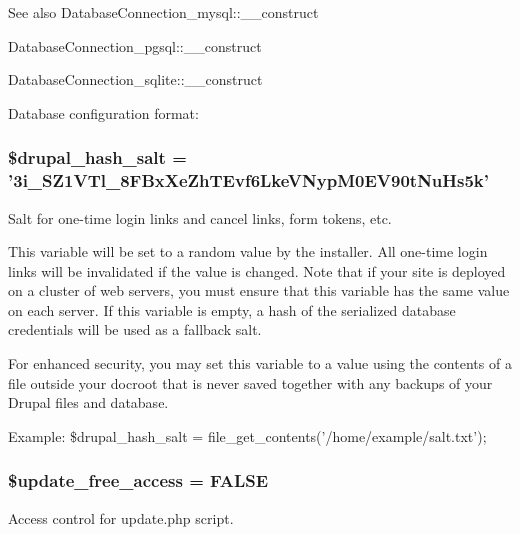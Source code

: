 \begin{DoxySeeAlso}{See also}
DatabaseConnection\_\-mysql::\_\-\_\-construct 

DatabaseConnection\_\-pgsql::\_\-\_\-construct 

DatabaseConnection\_\-sqlite::\_\-\_\-construct
\end{DoxySeeAlso}
Database configuration format: 
 \hypertarget{settings_8php_a75c981b07486dd3b07d5f122702dd87e}{
\subsubsection[{\$drupal\_\-hash\_\-salt}]{\setlength{\rightskip}{0pt plus 5cm}\$drupal\_\-hash\_\-salt = '3i\_\-SZ1VTl\_\-8FBxXeZhTEvf6LkeVNypM0EV90tNuHs5k'}}
\label{settings_8php_a75c981b07486dd3b07d5f122702dd87e}
Salt for one-\/time login links and cancel links, form tokens, etc.

This variable will be set to a random value by the installer. All one-\/time login links will be invalidated if the value is changed. Note that if your site is deployed on a cluster of web servers, you must ensure that this variable has the same value on each server. If this variable is empty, a hash of the serialized database credentials will be used as a fallback salt.

For enhanced security, you may set this variable to a value using the contents of a file outside your docroot that is never saved together with any backups of your Drupal files and database.

Example: \$drupal\_\-hash\_\-salt = file\_\-get\_\-contents('/home/example/salt.txt'); \hypertarget{settings_8php_afa06f20a6b90dec9a2573e779cd10b44}{
\subsubsection[{\$update\_\-free\_\-access}]{\setlength{\rightskip}{0pt plus 5cm}\$update\_\-free\_\-access = FALSE}}
\label{settings_8php_afa06f20a6b90dec9a2573e779cd10b44}
Access control for update.php script.

